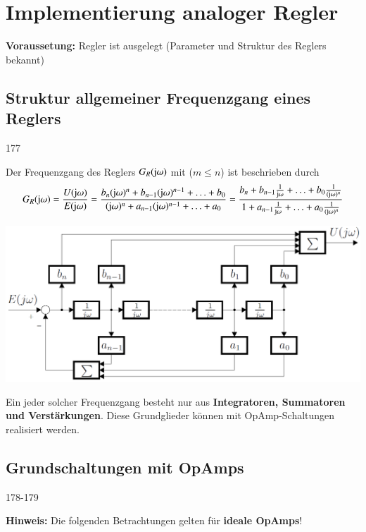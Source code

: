 \section{Implementierung analoger Regler}

\textbf{Voraussetung:} Regler ist ausgelegt (Parameter und Struktur des Reglers bekannt)


\subsection{Struktur allgemeiner Frequenzgang eines Reglers}{177}

Der Frequenzgang des Reglers $G_R(\mathrm{j} \omega)$ mit ($m \leq n$) ist beschrieben durch
$$ G_R(\mathrm{j} \omega) = \frac{U(\mathrm{j} \omega)}{E(\mathrm{j} \omega)} 
    = \frac{b_n (\mathrm{j} \omega)^n + b_{n-1}(\mathrm{j} \omega)^{n-1} + \ldots + b_0}{(\mathrm{j} \omega)^n + a_{n-1}(\mathrm{j} \omega)^{n-1} + \ldots + a_0} 
    = \frac{b_n + b_{n-1} \frac{1}{\mathrm{j} \omega} + \ldots + b_0 \frac{1}{(\mathrm{j} \omega)^n}}{1 + a_{n-1} \frac{1}{\mathrm{j} \omega} + \ldots + a_0 \frac{1}{(\mathrm{j} \omega)^n}} $$

\begin{minipage}[c]{0.55\columnwidth}
    \includegraphics[width=\columnwidth]{images/struktur_allgemeiner_frequenzgang.png}
\end{minipage}
\hfill
\begin{minipage}[c]{0.43\columnwidth}
    Ein jeder solcher Frequenzgang besteht nur aus \textbf{Integratoren, Summatoren und Verstärkungen}. 
    Diese Grundglieder können mit OpAmp-Schaltungen realisiert werden.
\end{minipage}


\subsection{Grundschaltungen mit OpAmps}{178-179}

\textbf{Hinweis:} Die folgenden Betrachtungen gelten für \textbf{ideale OpAmps}!


